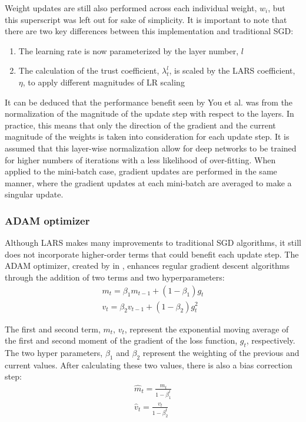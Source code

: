 Weight updates are still also performed across each individual weight, $w_i$, but this superscript was left out for sake of simplicity. It is important to note that there are two key differences between this implementation and traditional SGD:
\begin{enumerate}
    \item The learning rate is now parameterized by the layer number, $l$
    \item The calculation of the trust coefficient, $\lambda^l_t$, is scaled by the LARS coefficient, $\eta$, to apply different magnitudes of LR scaling
\end{enumerate}
\vspace{4pt}

It can be deduced that the performance benefit seen by You et al. was from the normalization of the magnitude of the update step with respect to the layers. In practice, this means that only the direction of the gradient and the current magnitude of the weights is taken into consideration for each update step. It is assumed that this layer-wise normalization allow for deep networks to be trained for higher numbers of iterations with a less likelihood of over-fitting. When applied to the mini-batch case, gradient updates are performed in the same manner, where the gradient updates at each mini-batch are averaged to make a singular update. 

\subsubsection{ADAM optimizer}
Although LARS makes many improvements to traditional SGD algorithms, it still does not incorporate higher-order terms that could benefit each update step. The ADAM optimizer, created by  in \cite{adam}, enhances regular gradient descent algorithms through the addition of two terms and two hyperparameters:
\vspace{-10pt}
\begin{align*}
m_{t} = \beta_{1}m_{t-1}+(1-\beta_{1})g_{t} \\
v_{t} = \beta_{2}v_{t-1}+(1-\beta_{2})g_{t}^2
\end{align*}

The first and second term, $m_{t}$, $v_t$, represent the exponential moving average of the first and second moment of the gradient of the loss function, $g_t$, respectively. The two hyper parameters, $\beta_1$ and $\beta_2$ represent the weighting of the previous and current values. After calculating these two values, there is also a bias correction step:
\begin{align*}
\hat{m}_{t}=\frac{m_t}{1-\beta_1^t} \\
\hat{v}_{t}=\frac{v_t}{1-\beta_2^t}
\end{align*}
\vspace{-10pt}

